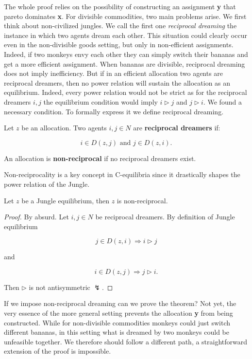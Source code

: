The whole proof relies on the possibility of constructing an assignment \textbf{y} that pareto dominates \textbf{x}. For divisible commodities, two main problems arise. We first think about non-civilized jungles. We call the first one \textit{reciprocal dreaming} the instance in which two agents dream each other. This situation could clearly occur even in the non-divisible goods setting, but only in non-efficient assignments. Indeed, if two monkeys envy each other they can simply switch their bananas and get a more efficient assignment. When bananas are divisible, reciprocal dreaming does not imply inefficiency. But if in an efficient allocation two agents are reciprocal dreamers, then no power relation will sustain the allocation as an equilibrium. Indeed, every power relation would not be strict as for the reciprocal dreamers $i,j$ the equilibrium condition would imply $i\triangleright j$ and $j\triangleright i$. We found a necessary condition. To formally express it we define reciprocal dreaming.

\begin{definition}\label{Def: reciprocal dreaming}
    Let $z$ be an allocation. Two agents $i,j\in N$ are \textbf{reciprocal dreamers} if:

    \[i \in D(z,j) \text{ and } j \in D(z,i).\]

    An allocation is \textbf{non-reciprocal} if no reciprocal dreamers exist. 
\end{definition}

Non-reciprocality is a key concept in C-equilibria since it drastically shapes the power relation of the Jungle. 


\begin{proposition}\label{Jungle implies no reciprocality}
    Let $z$ be a Jungle equilibrium, then $z$ is non-reciprocal.

    \begin{proof}
        By absurd. Let $i,j\in N$ be reciprocal dreamers. By definition of Jungle equilibrium

        \[j\in D(z,i)\Rightarrow i\triangleright j\]

        and 

        \[i \in D(z,j) \Rightarrow j\triangleright i.\]

        Then $\triangleright$ is not antisymmetric $\lightning$. 
    \end{proof}
\end{proposition}

If we impose non-reciprocal dreaming can we prove the theorem? Not yet, the very essence of the more general setting prevents the allocation \textbf{y} from being constructed. While for non-divisible commodities monkeys could just switch different bananas, in this setting what is dreamed by two monkeys could be unfeasible together. We therefore should follow a different path, a straightforward extension of the proof is impossible.

